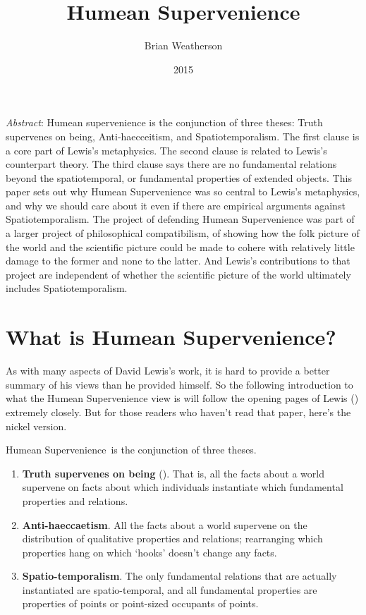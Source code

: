 \documentclass[
  11pt,
  letterpaper,
  DIV=11,
  numbers=noendperiod,
  twoside]{scrartcl}
\title{Humean Supervenience}
\author{Brian Weatherson}
\date{2015}
\providecommand{\tightlist}{%
  \setlength{\itemsep}{0pt}\setlength{\parskip}{0pt}}\usepackage{longtable,booktabs,array}
\renewenvironment{abstract}
 {\vspace{-1.25cm}
 \quotation\small\noindent\emph{Abstract}:}
 {\endquotation}
\begin{document}
\maketitle
\begin{abstract}
Humean supervenience is the conjunction of three theses: Truth
supervenes on being, Anti‐haecceitism, and Spatiotemporalism. The first
clause is a core part of Lewis's metaphysics. The second clause is
related to Lewis's counterpart theory. The third clause says there are
no fundamental relations beyond the spatiotemporal, or fundamental
properties of extended objects. This paper sets out why Humean
Supervenience was so central to Lewis's metaphysics, and why we should
care about it even if there are empirical arguments against
Spatiotemporalism. The project of defending Humean Supervenience was
part of a larger project of philosophical compatibilism, of showing how
the folk picture of the world and the scientific picture could be made
to cohere with relatively little damage to the former and none to the
latter. And Lewis's contributions to that project are independent of
whether the scientific picture of the world ultimately includes
Spatiotemporalism.
\end{abstract}


\section{What is Humean
Supervenience?}\label{what-is-humean-supervenience}

As with many aspects of David Lewis's work, it is hard to provide a
better summary of his views than he provided himself. So the following
introduction to what the Humean Supervenience view is will follow the
opening pages of Lewis () extremely
closely. But for those readers who haven't read that paper, here's the
nickel version.

Humean Supervenience~is the conjunction of three theses.

\begin{enumerate}
\def\labelenumi{\arabic{enumi}.}
\tightlist
\item
  \textbf{Truth supervenes on being} (). That is, all the facts about a world supervene on facts about
  which individuals instantiate which fundamental properties and
  relations.
\item
  \textbf{Anti-haeccaetism}. All the facts about a world supervene on
  the distribution of qualitative properties and relations; rearranging
  which properties hang on which `hooks' doesn't change any facts.
\item
  \textbf{Spatio-temporalism}. The only fundamental relations that are
  actually instantiated are spatio-temporal, and all fundamental
  properties are properties of points or point-sized occupants of
  points.
\end{enumerate}
\end{document}
